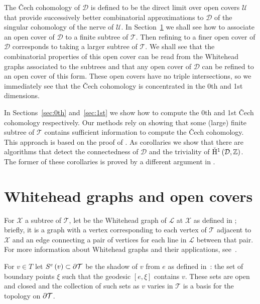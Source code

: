 The \v{C}ech cohomology of $\mathcal{D}$ is defined to be the direct limit
over open covers $\mathcal{U}$ that provide successively better combinatorial
approximations to $\mathcal{D}$ of the singular cohomology of the nerve of
$\mathcal{U}$. In Section~\ref{sec:whitehead} we shall see how to associate
an open cover of $\mathcal{D}$ to a finite subtree of $\mathcal{T}$. Then
refining to a finer open cover of $\mathcal{D}$ corresponds to taking a
larger subtree of $\mathcal{T}$. We shall see that the combinatorial
properties of this open cover can be read from the Whitehead graphs associated
to the subtrees and that any open cover of $\mathcal{D}$ can be refined to an
open cover of this form. These open covers have no triple intersections, so we
immediately see that the \v{C}ech cohomology is concentrated in the 0th and 1st
dimensions.

In Sections~\ref{sec:0th} and~\ref{sec:1st} we show how to compute the 0th and
1st \v{C}ech cohomology respectively. Our methods rely on showing that some
(large) finite subtree of $\mathcal{T}$ contains sufficient information to
compute the \v{C}ech cohomology. This approach is based on the proof of
\cite[Lemma 4.12]{cashenmacura11}. As corollaries we show that there are algorithms that
detect the connectedness of $\mathcal{D}$ and the triviality of
$\check{\mathrm{H}}{}^1\left(\mathcal{D}, \mathbb{Z} \right)$.  The former of these
corollaries is proved by a different argument in \cite{cashenmacura11}.

\section{Whitehead graphs and open covers}\label{sec:whitehead}

For $\mathcal{X}$ a subtree of $\mathcal{T}$, let  be the
Whitehead graph of $\mathcal{L}$ at $\mathcal{X}$ as defined in \cite{cashenmacura11};
briefly, it is a graph with a vertex corresponding to each vertex of
$\mathcal{T}$ adjacent to $\mathcal{X}$ and an edge connecting a pair of
vertices for each line in $\mathcal{L}$ between that pair. For more
information about Whitehead graphs and their applications, see~\cite{manning10}.

For $v \in T$ let $S^e\left(v\right) \subset \partial \mathcal{T}$ be the
shadow of $v$ from $e$ as defined in~\cite{cashenmacura11}: the set of boundary points
$\xi$ such that the geodesic $\left[e, \xi\right]$ contains $v$. These
sets are open and closed and the collection of such sets as $v$ varies in
$\mathcal{T}$ is a basis for the topology on $\partial\mathcal{T}$.


